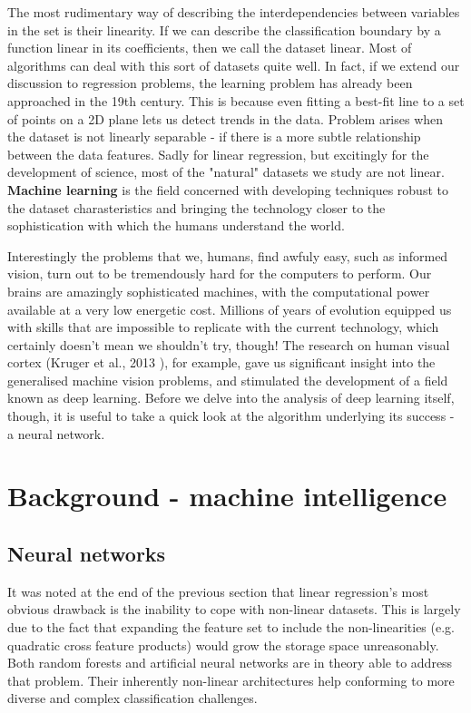 \documentclass[a4paper, 11pt]{article}
\numberwithin{equation}{section}
\begin{document}
		The most rudimentary way of describing the interdependencies between variables in the set is their linearity. If we can describe the classification boundary by a function linear in its coefficients, then we call the dataset linear. Most of algorithms can deal with this sort of datasets quite well. In fact, if we extend our discussion to regression problems, the learning problem has already been approached in the 19th century. This is because even fitting a best-fit line to a set of points on a 2D plane lets us detect trends in the data. Problem arises when the dataset is not linearly separable - if there is a more subtle relationship between the data features. Sadly for linear regression, but excitingly for the development of science, most of the "natural" datasets we study are not linear. \textbf{Machine learning} is the field concerned with developing techniques robust to the dataset charasteristics and bringing the technology closer to the sophistication with which the humans understand the world.
		
		Interestingly the problems that we, humans, find awfuly easy, such as informed vision, turn out to be tremendously hard for the computers to perform. Our brains are amazingly sophisticated machines, with the computational power available at a very low energetic cost. Millions of years of evolution equipped us with skills that are impossible to replicate with the current technology, which certainly doesn't mean we shouldn't try, though! The research on human visual cortex (Kruger et al., 2013 \cite{kruger2013deep}), for example, gave us significant insight into the generalised machine vision problems, and stimulated the development of a field known as deep learning. Before we delve into the analysis of deep learning itself, though, it is useful to take a quick look at the algorithm underlying its success - a neural network.
		
		\section{Background - machine intelligence}
		
		\subsection{Neural networks}
		
		\cite{ng2015coursera} It was noted at the end of the previous section that linear regression's most obvious drawback is the inability to cope with non-linear datasets. This is largely due to the fact that expanding the feature set to include the non-linearities (e.g. quadratic cross feature products) would grow the storage space unreasonably. Both random forests and artificial neural networks are in theory able to address that problem. Their inherently non-linear architectures help conforming to more diverse and complex classification challenges. \\
		
\end{document}
